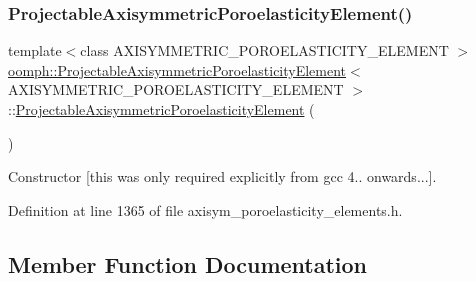 \subsubsection{\texorpdfstring{Projectable\+Axisymmetric\+Poroelasticity\+Element()}{ProjectableAxisymmetricPoroelasticityElement()}}
{\footnotesize\ttfamily template$<$class A\+X\+I\+S\+Y\+M\+M\+E\+T\+R\+I\+C\+\_\+\+P\+O\+R\+O\+E\+L\+A\+S\+T\+I\+C\+I\+T\+Y\+\_\+\+E\+L\+E\+M\+E\+NT $>$ \\
\hyperlink{classoomph_1_1ProjectableAxisymmetricPoroelasticityElement}{oomph\+::\+Projectable\+Axisymmetric\+Poroelasticity\+Element}$<$ A\+X\+I\+S\+Y\+M\+M\+E\+T\+R\+I\+C\+\_\+\+P\+O\+R\+O\+E\+L\+A\+S\+T\+I\+C\+I\+T\+Y\+\_\+\+E\+L\+E\+M\+E\+NT $>$\+::\hyperlink{classoomph_1_1ProjectableAxisymmetricPoroelasticityElement}{Projectable\+Axisymmetric\+Poroelasticity\+Element} (\begin{DoxyParamCaption}{ }\end{DoxyParamCaption})\hspace{0.3cm}{\ttfamily [inline]}}



Constructor \mbox{[}this was only required explicitly from gcc 4.. onwards...\mbox{]}. 



Definition at line 1365 of file axisym\+\_\+poroelasticity\+\_\+elements.\+h.



\subsection{Member Function Documentation}
\mbox{\label{classoomph_1_1ProjectableAxisymmetricPoroelasticityElement_a1c98590aaf05d668c742afc430c0f5b6}} 
